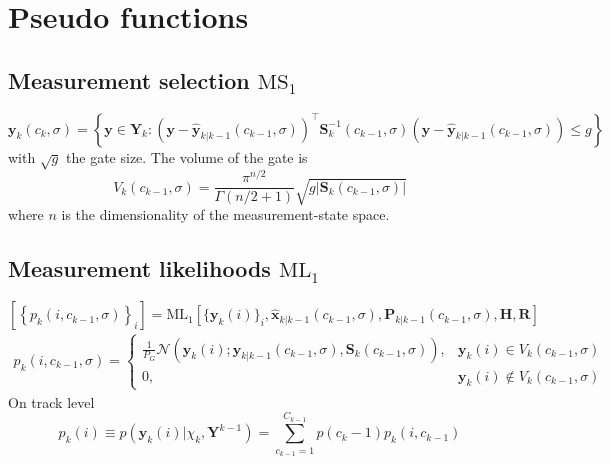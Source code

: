 \section{Pseudo functions}

\subsection{Measurement selection \texorpdfstring{$\text{MS}_1$}{MS1}\label{sec:MS}}
\begin{equation}
    \mathbf y_k(c_k, \sigma) = \left\{ \mathbf y \in \mathbf Y_k : (\mathbf y - \hat{\mathbf y}_{k|k-1}(c_{k-1}, \sigma))^\intercal\mathbf S^{-1}_k(c_{k-1}, \sigma)(\mathbf y -\hat{\mathbf y}_{k|k-1}(c_{k-1}, \sigma))\leq g \right\}
\end{equation}
with $\sqrt{g}$ the gate size. The volume of the gate is
\begin{equation}
    V_k(c_{k-1}, \sigma) = \frac{\pi^{n/2}}{\Gamma(n/2 + 1)}\sqrt{g|\mathbf S_k(c_{k-1}, \sigma)|}
\end{equation}
where $n$ is the dimensionality of the measurement-state space.

\subsection{Measurement likelihoods \texorpdfstring{$\text{ML}_1$}{ML1}}\label{sec:ML}
\begin{equation}
    \left[\left\{  p_k(i, c_{k-1}, \sigma) \right\}_i\right] = \text{ML}_1\!\left[\{\mathbf y_k(i)\}_i, \hat{\mathbf x}_{k|k-1}(c_{k-1},\sigma), \mathbf P_{k|k-1}(c_{k-1}, \sigma), \mathbf H, \mathbf R\right]
\end{equation}
\begin{align}
    p_k(i, c_{k-1}, \sigma) =
    \begin{cases}
        \frac{1}{P_G}\mathcal N(\mathbf y_k(i); \hat{\mathbf y}_{k|k-1}(c_{k-1}, \sigma), \mathbf S_k (c_{k-1}, \sigma)), & \mathbf y_k(i)\in V_k(c_{k-1}, \sigma)    \\
        0,                                                                                                                & \mathbf y_k(i)\notin V_k(c_{k-1}, \sigma)
    \end{cases}
\end{align}
On track level
\begin{equation}
    p_k(i) \equiv p(\mathbf y_k(i)|\chi_k, \mathbf Y^{k-1}) = \sum_{c_{k-1}=1}^{C_{k-1}}p(c_k-1)p_k(i, c_{k-1})
\end{equation}

